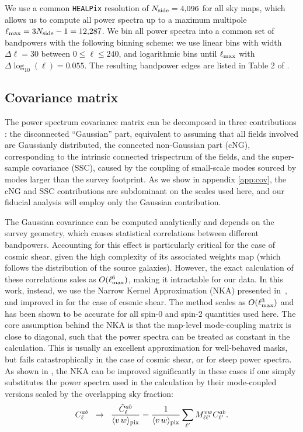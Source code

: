 \documentclass[a4paper,11pt]{article}
\newcommand{\lmax}{\ell_{\rm max}}
\newcommand{\healpix}{\texttt{HEALPix}\xspace}
\begin{document}
      We use a common \healpix resolution of $N_{\rm side}=4{,}096$ for all sky maps, which allows us to compute all power spectra up to a maximum multipole $\ell_{\rm max}=3N_{\rm side}-1=12{,}287$. We bin all power spectra into a common set of bandpowers with the following binning scheme: we use linear bins with width $\Delta \ell = 30$ between $0 \leq \ell \leq 240$, and logarithmic bins until $\lmax$ with $\Delta \log_{10}(\ell) = 0.055$. The resulting bandpower edges are listed in Table 2 of \cite{2010.09717}.

    
    \subsection{Covariance matrix}\label{ssec:meth.cov}
      The power spectrum covariance matrix can be decomposed in three contributions \cite{0810.4170,1302.6994}: the disconnected ``Gaussian'' part, equivalent to assuming that all fields involved are Gaussianly distributed, the connected non-Gaussian part (cNG), corresponding to the intrinsic connected trispectrum of the fields, and the super-sample covariance (SSC), caused by the coupling of small-scale modes sourced by modes larger than the survey footprint. As we show in appendix \ref{app:cov}, the cNG and SSC contributions are subdominant on the scales used here, and our fiducial analysis will employ only the Gaussian contribution.
      
      The Gaussian covariance can be computed analytically and depends on the survey geometry, which causes statistical correlations between different bandpowers. Accounting for this effect is particularly critical for the case of cosmic shear, given the high complexity of its associated weights map (which follows the distribution of the source galaxies). However, the exact calculation of these correlations sales as $O(\lmax^6)$, making it intractable for our data. In this work, instead, we use the Narrow Kernel Approximation (NKA) presented in~\cite{astro-ph/0307515,1906.11765}, and improved in \cite{2010.09717} for the case of cosmic shear. The method scales as $O(\lmax^3)$ and has been shown to be accurate for all spin-0 and spin-2 quantities used here. The core assumption behind the NKA is that the map-level mode-coupling matrix is close to diagonal, such that the power spectra can be treated as constant in the calculation. This is usually an excellent approximation for well-behaved masks, but fails catastrophically in the case of cosmic shear, or for steep power spectra. As shown in \cite{2010.09717}, the NKA can be improved significantly in these cases if one simply substitutes the power spectra used in the calculation by their mode-coupled versions scaled by the overlapping sky fraction:
      \begin{equation}\label{eq:clcov}
          C^{ab}_\ell\hspace{6pt}\rightarrow\hspace{6pt}\frac{\tilde{C}^{ab}_\ell}{\langle v\,w\rangle_{\rm pix}}=\frac{1}{\langle v\,w\rangle_{\rm pix}}\sum_{\ell '}M^{vw}_{\ell\ell'}C^{ab}_{\ell'}.
      \end{equation}
\end{document}
